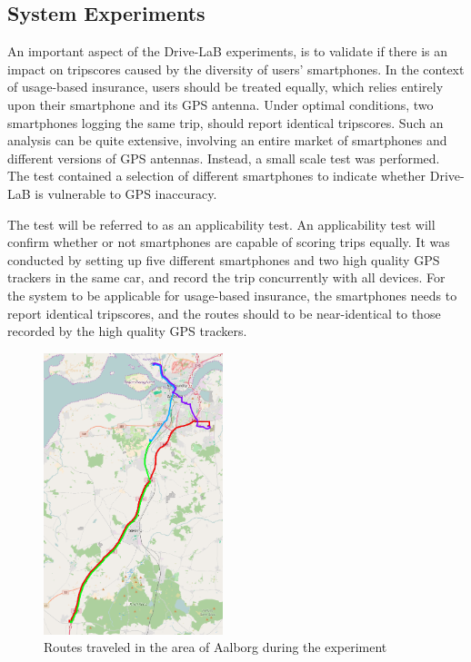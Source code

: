 \subsection{System Experiments}\label{subsec:expsystem}
An important aspect of the Drive-LaB experiments, is to validate if there is an impact on tripscores caused by the diversity of users' smartphones. In the context of usage-based insurance, users should be treated equally, which relies entirely upon their smartphone and its GPS antenna. Under optimal conditions, two smartphones logging the same trip, should report identical tripscores. Such an analysis can be quite extensive, involving an entire market of smartphones and different versions of GPS antennas. Instead, a small scale test was performed. The test contained a selection of different smartphones to indicate whether Drive-LaB is vulnerable to GPS inaccuracy. 

The test will be referred to as an applicability test. An applicability test will confirm whether or not smartphones are capable of scoring trips equally. It was conducted by setting up five different smartphones and two high quality GPS trackers\citep{quality_gps_device} in the same car, and record the trip concurrently with all devices. For the system to be applicable for usage-based insurance, the smartphones needs to report identical tripscores, and the routes should to be near-identical to those recorded by the high quality GPS trackers.
 
\begin{figure}[tb]
\centering
\includegraphics[width=0.465\textwidth]{Pictures/experiment_routes}
\caption{Routes traveled in the area of Aalborg during the experiment}
\label{fig:experiment_routes}
\end{figure}

